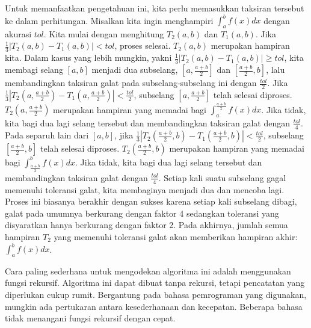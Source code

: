 Untuk memanfaatkan pengetahuan ini, kita perlu memasukkan taksiran
tersebut ke dalam perhitungan. Misalkan kita ingin menghampiri $\int_{a}^{b}f(x)dx$
dengan akurasi $tol$. Kita mulai dengan menghitung $T_{2}(a,b)$
dan $T_{1}(a,b)$. Jika $\frac{1}{3}\left|T_{2}(a,b)-T_{1}(a,b)\right|<tol$,
proses selesai. $T_{2}(a,b)$ merupakan hampiran kita. Dalam kasus
yang lebih mungkin, yakni $\frac{1}{3}\left|T_{2}(a,b)-T_{1}(a,b)\right|\geq tol$,
kita membagi selang $[a,b]$ menjadi dua subselang, $[a,\frac{a+b}{2}]$
dan $[\frac{a+b}{2},b]$, lalu membandingkan taksiran galat pada subselang-subselang
ini dengan $\frac{tol}{2}$. Jika $\frac{1}{3}\left|T_{2}(a,\frac{a+b}{2})-T_{1}(a,\frac{a+b}{2})\right|<\frac{tol}{2}$,
subselang $[a,\frac{a+b}{2}]$ telah selesai diproses. $T_{2}(a,\frac{a+b}{2})$
merupakan hampiran yang memadai bagi $\int_{a}^{\frac{a+b}{2}}f(x)dx$.
Jika tidak, kita bagi dua lagi selang tersebut dan membandingkan taksiran
galat dengan $\frac{tol}{4}$. Pada separuh lain dari $[a,b]$, jika
$\frac{1}{3}\left|T_{2}(\frac{a+b}{2},b)-T_{1}(\frac{a+b}{2},b)\right|<\frac{tol}{2}$,
subselang $[\frac{a+b}{2},b]$ telah selesai diproses. $T_{2}(\frac{a+b}{2},b)$
merupakan hampiran yang memadai bagi $\int_{\frac{a+b}{2}}^{b}f(x)dx$.
Jika tidak, kita bagi dua lagi selang tersebut dan membandingkan taksiran
galat dengan $\frac{tol}{4}$. Setiap kali suatu subselang gagal memenuhi
toleransi galat, kita membaginya menjadi dua dan mencoba lagi. Proses
ini biasanya berakhir dengan sukses karena setiap kali subselang dibagi,
galat pada umumnya berkurang dengan faktor 4 sedangkan toleransi yang
disyaratkan hanya berkurang dengan faktor 2. Pada akhirnya, jumlah
semua hampiran $T_{2}$ yang memenuhi toleransi galat akan memberikan
hampiran akhir: $\int_{a}^{b}f(x)dx$.

Cara paling sederhana untuk mengodekan algoritma ini adalah menggunakan
fungsi rekursif. Algoritma ini dapat dibuat tanpa rekursi, tetapi
pencatatan yang diperlukan cukup rumit. Bergantung pada bahasa pemrograman
yang digunakan, mungkin ada pertukaran antara kesederhanaan dan kecepatan.
Beberapa bahasa tidak menangani fungsi rekursif dengan cepat.


